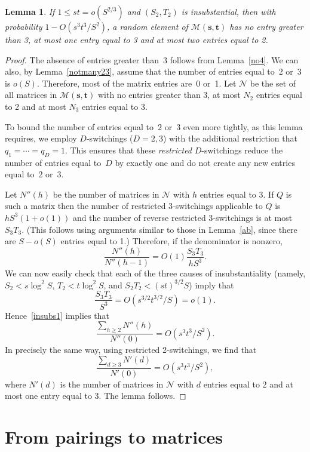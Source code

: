 \documentclass[12pt]{article}
\newtheorem{lemma}[theorem]{Lemma}
\numberwithin{equation}{section}
\def\N{{\mathcal{N}}}
\def\M{{\mathcal{M}}}
\def\svec{{\boldsymbol{s}}}
\def\tvec{{\boldsymbol{t}}}
\def\Mst{{\M(\svec,\tvec)}}
\begin{document}
\begin{lemma}\label{easycases}
If\/ $1\le st = o(S^{2/3})$ and $(S_2,T_2)$ is insubstantial, 
then with probability $1-O(s^3t^3/S^2)$, a random element of
$\Mst$ has no entry greater than 3, at
most one entry equal to 3 and at most two entries equal to 2.
\end{lemma}
\begin{proof}
The absence of entries greater than~3 follows from Lemma~\ref{no4}.
We can also, by Lemma~\ref{notmany23}, assume that the number
of entries equal to~2 or~3 is $o(S)$.
Therefore, most of the matrix entries are~0 or~1.
Let $\N$ be the set of all matrices in $\Mst$ with no entries
greater than 3, at most $N_2$
entries equal to 2 and at most $N_3$ entries equal to 3. 

To bound the number of entries equal to~2 or~3 even more tightly,
as this lemma requires, we employ $D$-switchings ($D=2,3$) with
the additional restriction that $q_1=\cdots=q_D=1$.
This ensures
that these \textit{restricted} $D$-switchings reduce the number
of entries equal to~$D$
by exactly one and do not create any new entries equal to~2 or~3.

Let $N''(h)$ be the number of matrices in $\N$ with $h$ 
entries equal to 3.  
If $Q$ is such a matrix then the number of restricted
$3$-switchings applicable to $Q$ is $hS^3(1+o(1))$
and the number of reverse restricted $3$-switchings is
at most $S_3T_3$. 
(This follows using arguments similar to those in Lemma~\ref{ab},
since there are $S-o(S)$ entries equal to 1.)
Therefore, if the denominator is nonzero,
\begin{equation}\label{insubs1}
   \frac{N''(h)}{N''(h{-}1)}
        = O(1) \frac{S_3T_3}{hS^3}.
\end{equation}
We can now easily check that each of the three causes
of insubstantiality (namely, $S_2 < s\log^2 S$, $T_2 < t\log^2 S$,
and 
$S_2T_2 < (st)^{3/2} S$) imply that
\[
   \frac{S_3T_3}{S^3} = O(s^{3/2}t^{3/2}/S) = o(1).
\]
Hence~\eqref{insubs1} implies that
\[
   \frac{\sum_{h\ge 2}N''(h)}{N''(0)}
      = O(s^3t^3/S^2).
\]
In precisely the same way, using restricted 2-switchings,
we find that
\[
   \frac{\sum_{d\ge 3}N'(d)}{N'(0)}
      = O(s^3t^3/S^2),
\]
where $N'(d)$ is the number of matrices in $\N$ with
$d$ entries equal to 2 and at most one entry equal to 3.  
The lemma follows.
\end{proof}


\section{From pairings to matrices}\label{s:pairings}
\end{document}
